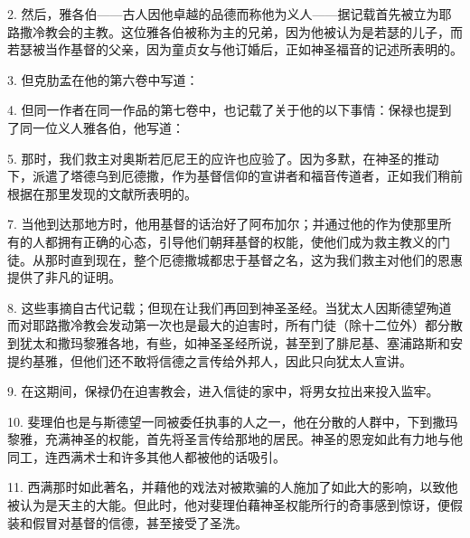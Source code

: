 2. 然后，雅各伯——古人因他卓越的品德而称他为义人——据记载首先被立为耶路撒冷教会的主教。这位雅各伯被称为主的兄弟，因为他被认为是若瑟的儿子，而若瑟被当作基督的父亲，因为童贞女与他订婚后，正如神圣福音的记述所表明的。\par

3. 但克肋孟在他的第六卷中写道：\par

4. 但同一作者在同一作品的第七卷中，也记载了关于他的以下事情：保禄也提到了同一位义人雅各伯，他写道：\par

5. 那时，我们救主对奥斯若厄尼王的应许也应验了。因为多默，在神圣的推动下，派遣了塔德乌到厄德撒，作为基督信仰的宣讲者和福音传道者，正如我们稍前根据在那里发现的文献所表明的。\par

7. 当他到达那地方时，他用基督的话治好了阿布加尔；并通过他的作为使那里所有的人都拥有正确的心态，引导他们朝拜基督的权能，使他们成为救主教义的门徒。从那时直到现在，整个厄德撒城都忠于基督之名，这为我们救主对他们的恩惠提供了非凡的证明。\par

8. 这些事摘自古代记载；但现在让我们再回到神圣圣经。当犹太人因斯德望殉道而对耶路撒冷教会发动第一次也是最大的迫害时，所有门徒（除十二位外）都分散到犹太和撒玛黎雅各地，有些，如神圣圣经所说，甚至到了腓尼基、塞浦路斯和安提约基雅，但他们还不敢将信德之言传给外邦人，因此只向犹太人宣讲。\par

9. 在这期间，保禄仍在迫害教会，进入信徒的家中，将男女拉出来投入监牢。\par

10. 斐理伯也是与斯德望一同被委任执事的人之一，他在分散的人群中，下到撒玛黎雅，充满神圣的权能，首先将圣言传给那地的居民。神圣的恩宠如此有力地与他同工，连西满术士和许多其他人都被他的话吸引。\par

11. 西满那时如此著名，并藉他的戏法对被欺骗的人施加了如此大的影响，以致他被认为是天主的大能。但此时，他对斐理伯藉神圣权能所行的奇事感到惊讶，便假装和假冒对基督的信德，甚至接受了圣洗。\par


